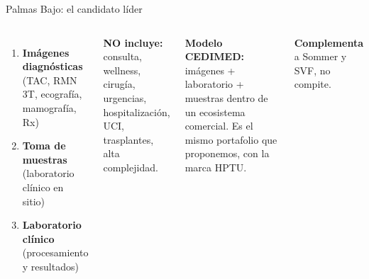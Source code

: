 \documentclass[aspectratio=169, 11pt]{beamer}
\begin{document}
\begin{frame}{Palmas Bajo: el candidato l\'{i}der}
\begin{columns}[T]
{\scriptsize
\begin{enumerate}\setlength{\itemsep}{2pt}
  \item \textbf{Im\'{a}genes diagn\'{o}sticas} (TAC, RMN 3T, ecograf\'{i}a, mamograf\'{i}a, Rx)
  \item \textbf{Toma de muestras} (laboratorio cl\'{i}nico en sitio)
  \item \textbf{Laboratorio cl\'{i}nico} (procesamiento y resultados)
\end{enumerate}
}

\vspace{4pt}
{\scriptsize\textcolor{comp}{\textbf{NO incluye:}} consulta, wellness, cirug\'{i}a, urgencias, hospitalizaci\'{o}n, UCI, trasplantes, alta complejidad.}

\vspace{4pt}
{\scriptsize\textcolor{acc}{\textbf{Modelo CEDIMED:}} im\'{a}genes + laboratorio + muestras dentro de un ecosistema comercial. Es el mismo portafolio que proponemos, con la marca HPTU.}

\vspace{2pt}
{\scriptsize\textbf{Complementa} a Sommer y SVF, no compite.}
\end{columns}
\end{frame}
\end{document}
